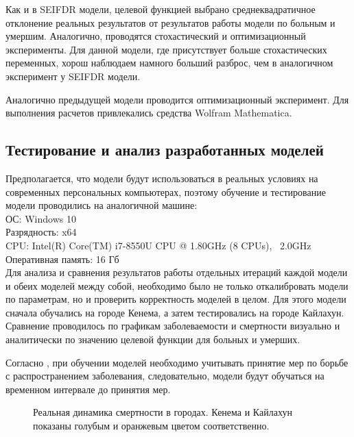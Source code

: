 Как и в SEIFDR модели, целевой функцией выбрано среднеквадратичное отклонение реальных результатов от результатов работы модели по  больным и умершим. Аналогично, проводятся стохастический и оптимизационный эксперименты. 
Для данной модели, где присутствует больше стохастических переменных, хорош наблюдаем намного больший разброс, чем в аналогичном эксперимент у SEIFDR модели.

Аналогично предыдущей модели проводится оптимизационный эксперимент. Для выполнения расчетов привлекались средства Wolfram Mathematica.

\subsection{Тестирование и анализ разработанных моделей}

Предполагается, что модели будут использоваться в реальных условиях на современных персональных компьютерах, поэтому обучение и тестирование модели проводились на аналогичной машине: \\
ОС: Windows 10 \\
Разрядность: x64 \\
CPU: Intel(R) Core(TM) i7-8550U CPU @ 1.80GHz (8 CPUs), ~2.0GHz \\
Оперативная память: 16 Гб \\

Для анализа и сравнения результатов работы отдельных итераций каждой модели и обеих моделей между собой, необходимо было не только откалибровать модели по параметрам, но и проверить корректность моделей в целом. Для этого модели сначала обучались на  городе Кенема, а затем тестировались на городе Кайлахун. Сравнение проводилось по графикам заболеваемости и смертности визуально  и аналитически по значению целевой функции для больных и умерших. 

Согласно %
\cite{Bykova:2015}, при обучении моделей необходимо учитывать принятие мер по борьбе с распространением заболевания, следовательно, модели будут обучаться на временном интервале до принятия мер.


\begin{figure}[H] 
	\caption{Реальная динамика смертности в городах. Кенема и Кайлахун показаны голубым и оранжевым цветом соответственно.}
	\label{RealDeadData}
\end{figure}



